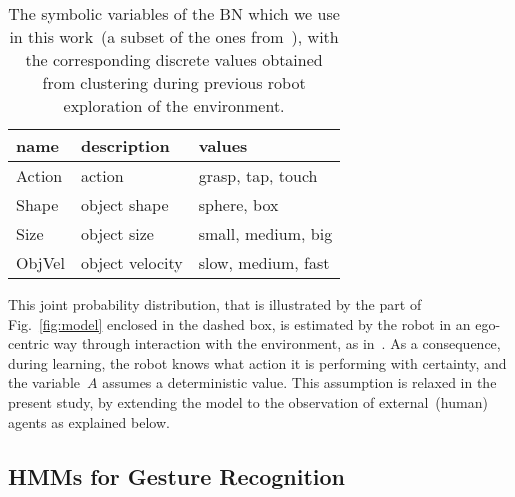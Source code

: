 \begin{table}
    \centering
    \caption{The symbolic variables of the \acl{BN} which we use in this work~(a subset of the ones from~\cite{salvi:2012:smcb}), with the corresponding discrete values obtained from clustering during previous robot exploration of the environment.}
    \label{tab:bnsymb}
    \begin{tabular}{*{3}{l}} %
    \toprule
    name   & description     & values \\
    \midrule
    Action & action          & grasp, tap, touch \\
    Shape  & object shape    & sphere, box \\
    Size   & object size     & small, medium, big \\
    ObjVel & object velocity & slow, medium, fast \\
    \bottomrule
    \end{tabular}
\end{table}

This joint probability distribution, that is illustrated by the part of Fig.~\ref{fig:model} enclosed in the dashed box, is estimated by the robot in an ego-centric way through interaction with the environment, as in~\cite{salvi:2012:smcb}. As a consequence, during learning, the robot knows what action it is performing with certainty, and the variable~$A$ assumes a deterministic value. This assumption is relaxed in the present study, by extending the model to the observation of external~(human) agents as explained below.

\subsection{\aclp{HMM} for Gesture Recognition}

\newcommand{\myscalefactor}{0.8}

\newcommand{\standardhmm}[1]{
    \node[draw,circle] (hmm#1s1) {1};
    \node[draw,circle, right of=hmm#1s1] (hmm#1s2) {2};
    \node[circle, right of=hmm#1s2] (hmm#1s3) {\dots};
    \node[draw,circle, right of=hmm#1s3] (hmm#1s4) {Q};
    \node[left of=hmm#1s1]  (invisible1) {};
    \node[right of=hmm#1s4] (invisible2) {};
    \path[->] (hmm#1s1) edge (hmm#1s2);
    \path[loop above] (hmm#1s1) edge (hmm#1s1);
    \path[->] (hmm#1s2) edge (hmm#1s3);
    \path[loop above] (hmm#1s2) edge (hmm#1s2);
    \path[dashed] (hmm#1s2) -- (hmm#1s3);
    \path[->] (hmm#1s3) edge (hmm#1s4);
    \path[loop above] (hmm#1s4) edge (hmm#1s4);
    \path[->] (invisible1) edge (hmm#1s1);
    \path[->] (hmm#1s4) edge (invisible2);
}

